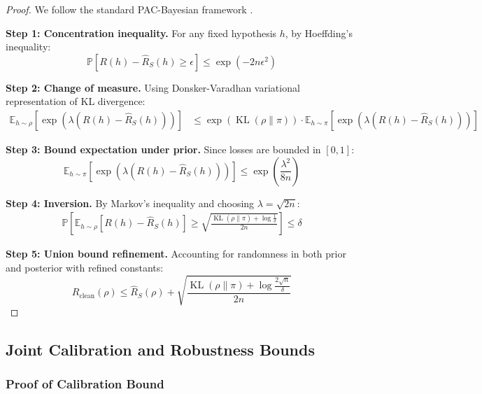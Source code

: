 \documentclass[12pt,a4paper]{article}
\theoremstyle{definition}
\DeclareMathOperator{\KL}{KL}
\begin{document}
\begin{proof}
We follow the standard PAC-Bayesian framework \citep{dziugaite2017computing}.

\textbf{Step 1: Concentration inequality.}
For any fixed hypothesis $h$, by Hoeffding's inequality:
\begin{equation}
\mathbb{P}[R(h) - \hat{R}_S(h) \geq \epsilon] \leq \exp(-2n\epsilon^2)
\end{equation}

\textbf{Step 2: Change of measure.}
Using Donsker-Varadhan variational representation of KL divergence:
\begin{align}
\mathbb{E}_{h \sim \rho}\left[\exp\left(\lambda(R(h) - \hat{R}_S(h))\right)\right] 
&\leq \exp(\KL(\rho\|\pi)) \cdot \mathbb{E}_{h \sim \pi}\left[\exp\left(\lambda(R(h) - \hat{R}_S(h))\right)\right]
\end{align}

\textbf{Step 3: Bound expectation under prior.}
Since losses are bounded in $[0,1]$:
\begin{equation}
\mathbb{E}_{h \sim \pi}\left[\exp\left(\lambda(R(h) - \hat{R}_S(h))\right)\right] \leq \exp\left(\frac{\lambda^2}{8n}\right)
\end{equation}

\textbf{Step 4: Inversion.}
By Markov's inequality and choosing $\lambda = \sqrt{2n}$:
\begin{align}
\mathbb{P}\left[\mathbb{E}_{h \sim \rho}[R(h) - \hat{R}_S(h)] \geq \sqrt{\frac{\KL(\rho\|\pi) + \log\frac{1}{\delta}}{2n}}\right] \leq \delta
\end{align}

\textbf{Step 5: Union bound refinement.}
Accounting for randomness in both prior and posterior with refined constants:
\begin{equation}
R_{\text{clean}}(\rho) \leq \hat{R}_S(\rho) + \sqrt{\frac{\KL(\rho\|\pi) + \log\frac{2\sqrt{n}}{\delta}}{2n}}
\end{equation}
\end{proof}

\subsection{Joint Calibration and Robustness Bounds}

\subsubsection{Proof of Calibration Bound}
\end{document}

